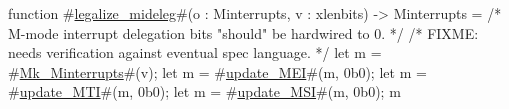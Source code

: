 function #\hyperref[sailRISCVzlegalizzezymideleg]{legalize\_mideleg}#(o : Minterrupts, v : xlenbits) -> Minterrupts = {
  /* M-mode interrupt delegation bits "should" be hardwired to 0. */
  /* FIXME: needs verification against eventual spec language. */
  let m = #\hyperref[sailRISCVzMkzyMinterrupts]{Mk\_Minterrupts}#(v);
  let m = #\hyperref[sailRISCVzupdatezyMEI]{update\_MEI}#(m, 0b0);
  let m = #\hyperref[sailRISCVzupdatezyMTI]{update\_MTI}#(m, 0b0);
  let m = #\hyperref[sailRISCVzupdatezyMSI]{update\_MSI}#(m, 0b0);
  m
}

